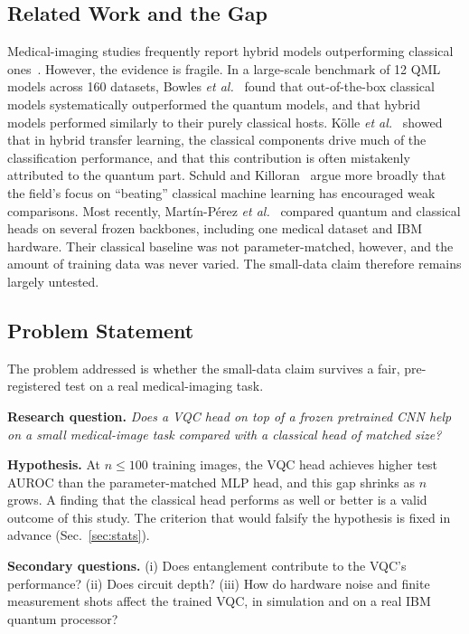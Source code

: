 \documentclass[conference]{IEEEtran}
\begin{document}
\subsection{Related Work and the Gap}
Medical-imaging
studies frequently report hybrid models outperforming classical
ones~\cite{shahjalal2025}. However, the evidence is fragile. In a large-scale
benchmark of 12 QML models across 160 datasets, Bowles
\emph{et al.}~\cite{bowles2024} found that out-of-the-box classical models
systematically outperformed the quantum models, and that hybrid models
performed similarly to their purely classical hosts. Kölle
\emph{et al.}~\cite{kolle2024} showed that in hybrid transfer learning, the
classical components drive much of the classification performance, and
that this contribution is often mistakenly attributed to the quantum part.
Schuld and Killoran~\cite{schuldkilloran2022} argue more broadly that the
field's focus on ``beating'' classical machine learning has encouraged weak
comparisons. Most recently, Martín-Pérez \emph{et al.}~\cite{martinperez2026}
compared quantum and classical heads on several frozen backbones, including
one medical dataset and IBM hardware. Their classical baseline was not
parameter-matched, however, and the amount of training data was never
varied. The small-data claim therefore remains largely untested.

\subsection{Problem Statement}
\label{sec:problem}
The problem addressed is whether the small-data claim survives a fair,
pre-registered test on a real medical-imaging task.

\textbf{Research question.} \emph{Does a VQC head on top of a frozen
pretrained CNN help on a small medical-image task compared with a classical
head of matched size?}

\textbf{Hypothesis.} At $n\le100$ training images, the VQC head achieves
higher test AUROC than the parameter-matched MLP head, and this gap shrinks
as $n$ grows. A finding that the classical head performs as well or better
is a valid outcome of this study. The criterion that would falsify the
hypothesis is fixed in advance (Sec.~\ref{sec:stats}).

\textbf{Secondary questions.} (i) Does entanglement contribute to the
VQC's performance? (ii) Does circuit depth? (iii) How do hardware noise and
finite measurement shots affect the trained VQC, in simulation and on a
real IBM quantum processor?
\end{document}
